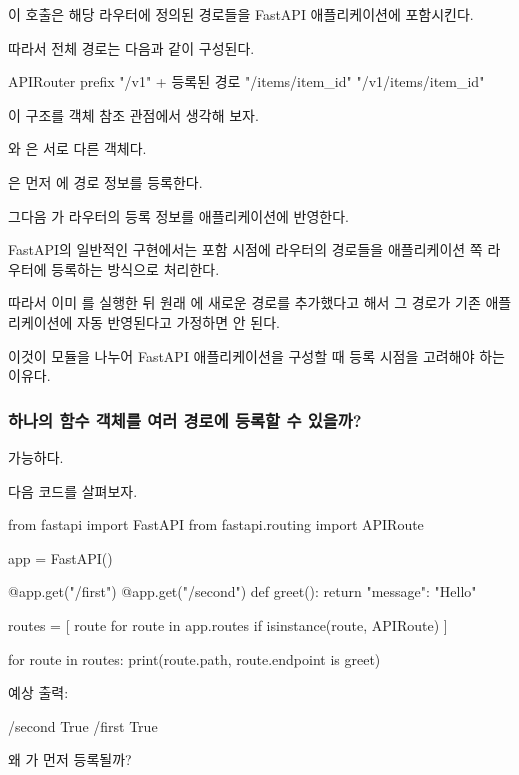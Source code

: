 이 호출은 해당 라우터에 정의된 경로들을 FastAPI 애플리케이션에 포함시킨다.

따라서 전체 경로는 다음과 같이 구성된다.

\begin{dhksmry}[centered]
APIRouter prefix "/v1"
+
등록된 경로 "/items/{item_id}"
\da
"/v1/items/{item_id}"
\end{dhksmry}

이 구조를 객체 참조 관점에서 생각해 보자.

와 은 서로 다른 객체다.

은 먼저 에 경로 정보를 등록한다.

그다음 가 라우터의 등록 정보를 애플리케이션에 반영한다.

FastAPI의 일반적인  구현에서는 포함 시점에 라우터의 경로들을 애플리케이션 쪽 라우터에 등록하는 방식으로 처리한다.

따라서 이미 를 실행한 뒤 원래 에 새로운 경로를 추가했다고 해서 그 경로가 기존 애플리케이션에 자동 반영된다고 가정하면 안 된다.

이것이 모듈을 나누어 FastAPI 애플리케이션을 구성할 때 등록 시점을 고려해야 하는 이유다.

\subsubsection{하나의 함수 객체를 여러 경로에 등록할 수 있을까?}

가능하다.

다음 코드를 살펴보자.

\begin{dhkcode}
from fastapi import FastAPI
from fastapi.routing import APIRoute


app = FastAPI()


@app.get("/first")
@app.get("/second")
def greet():
    return {"message": "Hello"}


routes = [
    route
    for route in app.routes
    if isinstance(route, APIRoute)
]

for route in routes:
    print(route.path, route.endpoint is greet)
\end{dhkcode}

예상 출력:

\begin{dhkzsh}
/second True
/first True
\end{dhkzsh}

왜 가 먼저 등록될까?

